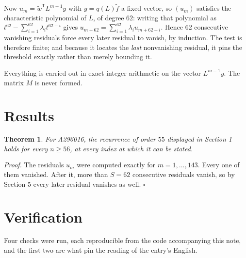 \documentclass[11pt]{article}
\newtheorem{theorem}{Theorem}
\theoremstyle{definition}
\begin{document}
Now $u_m = \tilde w^{\mathsf T} L^{m-1} y$ with $y = q(L)\tilde f$ a fixed vector, so $(u_m)$ satisfies the characteristic polynomial of $L$, of degree $62$: writing that polynomial as $t^{62} - \sum_{i=1}^{62} \lambda_i t^{62-i}$ gives $u_{m+62} = \sum_{i=1}^{62} \lambda_i u_{m+62-i}$. Hence $62$ consecutive vanishing residuals force every later residual to vanish, by induction. The test is therefore finite; and because it locates the {\itshape last} nonvanishing residual, it pins the threshold exactly rather than merely bounding it.

Everything is carried out in exact integer arithmetic on the vector $L^{m-1}y$. The matrix $M$ is never formed.

\section{Results}

\begin{theorem} For A296016, the recurrence of order $55$ displayed in Section 1 holds for every $n \ge 56$, at every index at which it can be stated.\end{theorem}

{\itshape Proof.} The residuals $u_m$ were computed exactly for $m = 1,\dots,143$. Every one of them vanished. After it, more than $S = 62$ consecutive residuals vanish, so by Section 5 every later residual vanishes as well. $\square$

\section{Verification}

Four checks were run, each reproducible from the code accompanying this note, and the first two are what pin the reading of the entry's English.
\end{document}
